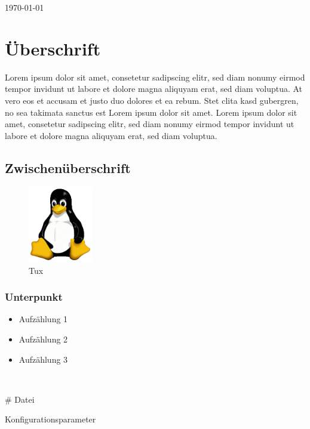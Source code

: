 \documentclass{scrartcl}
\newcommand{\terminal}[1]{
	\vspace*{-0.2cm}
	\begin{small}
		\colorbox{terminal}{
			\parbox[t]{\textwidth}{
				\vspace*{0.1cm}
				\textcolor{white}{
					{#1}
					\vspace*{0.1cm}
				}
			}
		}
	\end{small}
	\vspace*{0.0cm}
}
\begin{document}
\begin{titlepage}
\begin{flushright}
    \vspace{4cm}
    
    \today
\end{flushright}
\end{titlepage}
\pagestyle{fancyDefault}
\vspace*{1.5cm} %
\tableofcontents
\newpage

\section{Überschrift}

Lorem ipsum dolor sit amet, consetetur sadipscing elitr, sed diam nonumy eirmod tempor invidunt ut labore et dolore magna aliquyam erat, sed diam voluptua. At vero eos et accusam et justo duo dolores et ea rebum. Stet clita kasd gubergren, no sea takimata sanctus est Lorem ipsum dolor sit amet. Lorem ipsum dolor sit amet, consetetur sadipscing elitr, sed diam nonumy eirmod tempor invidunt ut labore et dolore magna aliquyam erat, sed diam voluptua.

\subsection{Zwischenüberschrift}

\begin{figure}[h!]
\centering
\includegraphics[width=0.25\textwidth]{Tux}
\caption{Tux}
\label{threadsVsSync}
\end{figure}

\subsubsection{Unterpunkt}

\begin{itemize}
    \item Aufzählung 1
    \item Aufzählung 2
    \item Aufzählung 3
\end{itemize}

\terminal{user\$ sudo make me a sandwich}

\begin{serverconfig}
# Datei

Konfigurationsparameter
\end{serverconfig}
\end{document}
